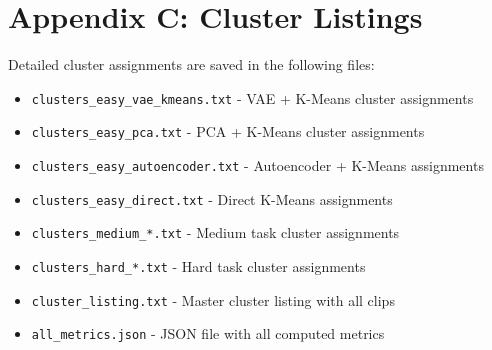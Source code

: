 \documentclass{article}
\begin{document}
\section{Appendix C: Cluster Listings}

Detailed cluster assignments are saved in the following files:
\begin{itemize}
    \item \texttt{clusters\_easy\_vae\_kmeans.txt} - VAE + K-Means cluster assignments
    \item \texttt{clusters\_easy\_pca.txt} - PCA + K-Means cluster assignments
    \item \texttt{clusters\_easy\_autoencoder.txt} - Autoencoder + K-Means assignments
    \item \texttt{clusters\_easy\_direct.txt} - Direct K-Means assignments
    \item \texttt{clusters\_medium\_*.txt} - Medium task cluster assignments
    \item \texttt{clusters\_hard\_*.txt} - Hard task cluster assignments
    \item \texttt{cluster\_listing.txt} - Master cluster listing with all clips
    \item \texttt{all\_metrics.json} - JSON file with all computed metrics
\end{itemize}
\end{document}
